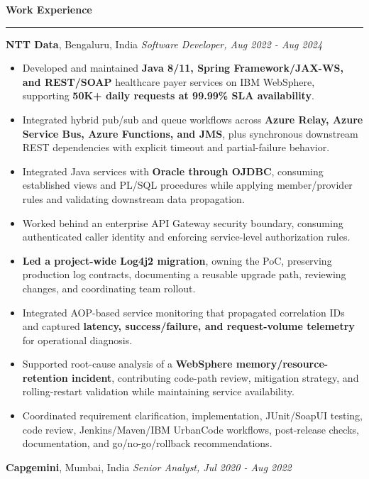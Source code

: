 \documentclass[11pt,letterpaper]{article}
\newcommand{\ressection}[1]{\Needspace{6\baselineskip}\vspace{8pt}\par\textbf{#1}\par\vspace{2pt}\hrule\vspace{5pt}}
\begin{document}
\ressection{Work Experience}
\textbf{NTT Data}, Bengaluru, India \hfill \textit{Software Developer, Aug 2022 - Aug 2024}
\begin{itemize}
  \item Developed and maintained \textbf{Java 8/11, Spring Framework/JAX-WS, and REST/SOAP} healthcare payer services on IBM WebSphere, supporting \textbf{50K+ daily requests at 99.99\% SLA availability}.
  \item Integrated hybrid pub/sub and queue workflows across \textbf{Azure Relay, Azure Service Bus, Azure Functions, and JMS}, plus synchronous downstream REST dependencies with explicit timeout and partial-failure behavior.
  \item Integrated Java services with \textbf{Oracle through OJDBC}, consuming established views and PL/SQL procedures while applying member/provider rules and validating downstream data propagation.
  \item Worked behind an enterprise API Gateway security boundary, consuming authenticated caller identity and enforcing service-level authorization rules.
  \item \textbf{Led a project-wide Log4j2 migration}, owning the PoC, preserving production log contracts, documenting a reusable upgrade path, reviewing changes, and coordinating team rollout.
  \item Integrated AOP-based service monitoring that propagated correlation IDs and captured \textbf{latency, success/failure, and request-volume telemetry} for operational diagnosis.
  \item Supported root-cause analysis of a \textbf{WebSphere memory/resource-retention incident}, contributing code-path review, mitigation strategy, and rolling-restart validation while maintaining service availability.
  \item Coordinated requirement clarification, implementation, JUnit/SoapUI testing, code review, Jenkins/Maven/IBM UrbanCode workflows, post-release checks, documentation, and go/no-go/rollback recommendations.
\end{itemize}
\textbf{Capgemini}, Mumbai, India \hfill \textit{Senior Analyst, Jul 2020 - Aug 2022}
\end{document}
